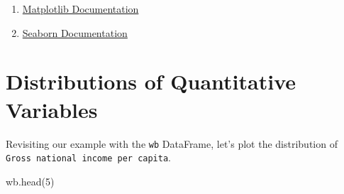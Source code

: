 \documentclass[
  letterpaper,
  DIV=11,
  numbers=noendperiod]{scrreprt}
\newenvironment{Shaded}{\begin{snugshade}}{\end{snugshade}}
\newcommand{\DecValTok}[1]{\textcolor[rgb]{0.68,0.00,0.00}{#1}}
\newcommand{\NormalTok}[1]{\textcolor[rgb]{0.00,0.23,0.31}{#1}}
\providecommand{\tightlist}{%
  \setlength{\itemsep}{0pt}\setlength{\parskip}{0pt}}\usepackage{longtable,booktabs,array}
\begin{document}
\begin{enumerate}
\def\labelenumi{\arabic{enumi}.}
\tightlist
\item
  \href{https://matplotlib.org/stable/index.html}{Matplotlib
  Documentation}
\item
  \href{https://seaborn.pydata.org/}{Seaborn Documentation}
\end{enumerate}

\section{Distributions of Quantitative
Variables}\label{distributions-of-quantitative-variables}

Revisiting our example with the \texttt{wb} DataFrame, let's plot the
distribution of \texttt{Gross\ national\ income\ per\ capita}.

\begin{Shaded}
\begin{Highlighting}[]
\NormalTok{wb.head(}\DecValTok{5}\NormalTok{)}
\end{Highlighting}
\end{Shaded}
\end{document}

